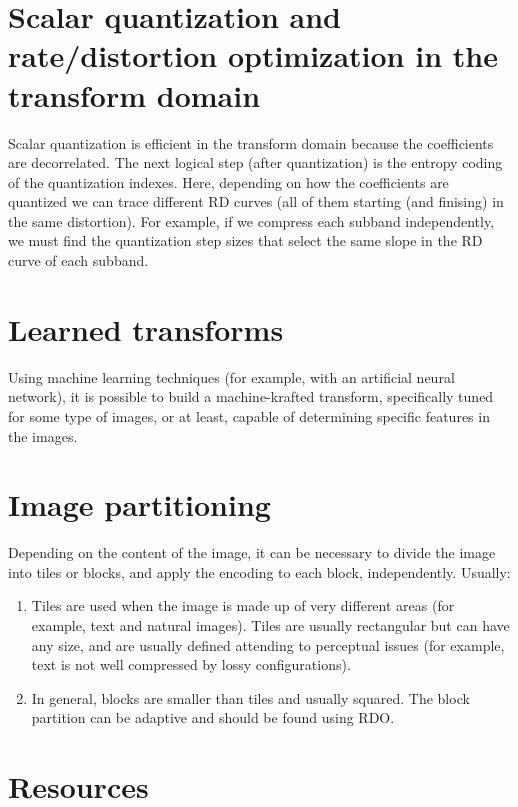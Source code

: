 
\section{Scalar quantization and rate/distortion optimization in the transform domain}

Scalar quantization is efficient in the transform domain because the
coefficients are decorrelated. The next logical step (after
quantization) is the entropy coding of the quantization indexes. Here,
depending on how the coefficients are quantized we can trace different
RD curves (all of them starting (and finising) in the same
distortion). For example, if we compress each subband independently,
we must find the quantization step sizes that select the same slope in
the RD curve of each subband.


\section{Learned transforms}

Using machine learning techniques (for example, with an artificial
neural network), it is possible to build a machine-krafted transform,
specifically tuned for some type of images, or at least, capable of
determining specific features in the images.


\section{Image partitioning}

Depending on the content of the image, it can be necessary to divide
the image into tiles or blocks, and apply the encoding to each block,
independently. Usually:
\begin{enumerate}
\item Tiles are used when the image is made up of very different areas
  (for example, text and natural images). Tiles are usually
  rectangular but can have any size, and are usually defined attending
  to perceptual issues (for example, text is not well compressed by
  lossy configurations).
\item In general, blocks are smaller than tiles and usually
  squared. The block partition can be adaptive and should be found
  using RDO.
\end{enumerate}

\section{Resources}

